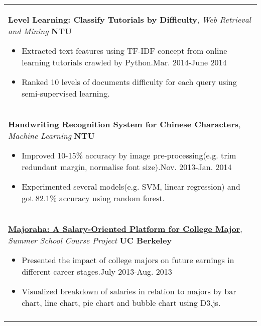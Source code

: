 \documentclass[a4paper,10pt]{article} %
\begin{document}
{\begin{tabular}{p{18.5cm}}
{\fontsize{11}{13.2}\textbf{Level Learning: Classify Tutorials by Difficulty}}, {\it{Web Retrieval and Mining}} \hfill \textbf{NTU} 
\vspace{0.5mm}
\begin{itemize}
\item Extracted text features using TF-IDF concept from online learning tutorials crawled by Python.\hfill Mar. 2014-June 2014
\item Ranked 10 levels of documents difficulty for each query using semi-supervised learning.\vspace*{-\baselineskip}
\end{itemize}\\
\vspace{0.5mm}

{\fontsize{11}{13.2}\textbf{Handwriting Recognition System for Chinese Characters}}, {\it{Machine Learning}} \hfill \textbf{NTU}  
\vspace{0.5mm}
\begin{itemize}
\item Improved 10-15\% accuracy by image pre-processing(e.g. trim redundant margin, normalise font size).\hfill  Nov. 2013-Jan. 2014
\item Experimented several models(e.g. SVM, linear regression) and got 82.1\% accuracy using random forest.\vspace*{-\baselineskip}
\end{itemize}\\
\vspace{0.5mm}

{\fontsize{11}{13.2}\textbf{\href{http://people.ischool.berkeley.edu/~charleswang/i153/final/facetBrowser/index.html}{Majoraha: A Salary-Oriented Platform for College Major}}}, {\it{Summer School Course Project}} \hfill \textbf{UC Berkeley} 
\vspace{0.5mm}
\begin{itemize}
\item Presented the impact of college majors on future earnings in different career stages.\hfill  July 2013-Aug. 2013
\item Visualized breakdown of salaries in relation to majors by bar chart, line chart, pie chart and bubble chart using D3.js. \vspace*{-\baselineskip}
\end{itemize}\\
\vspace{0.5mm}


\end{tabular}}
\end{document}
